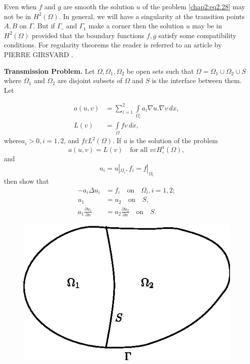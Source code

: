 \begin{REM}\label{chap2:rem3}
Even when $f$ and $g$ are smooth the solution $u$ of the problem
\eqref{chap2:eq2.28} may not be in $H^2(\Omega)$. In general, we will
have a singularity at the transition points $A, B$ on $\Gamma$. But if
$\Gamma_\circ$ and $\Gamma_1$ make a corner then the solution $u$ may
be in $H^2(\Omega)$ provided that the boundary functions $f, g$
satisfy some compatibility conditions. For regularity theorems the
reader is referred to an article by PIERRE GIRSVARD \cite{key22}.
\end{REM}

\setcounter{exer}{0}
\begin{exer}\label{chap2:exr1}
{\bf Transmission Problem.} Let $\Omega, \Omega_1, \Omega_2$ be open
sets such that $\Omega =\Omega_1\cup\Omega_2\cup S$ where $\Omega_1$
and $\Omega_2$ are disjoint subsets of $\Omega$ and $S$ is the
interface between them. Let 
\end{exer}
\begin{align*}
a(u, v) &= \sum\limits_{i=1}^2\int\limits_{\Omega_i}a_i\nabla
u.\nabla v\,dx,\\
L(v) &= \int\limits_\Omega fv\,dx, 
\end{align*}
where\pageoriginale $a_i>0, i=1, 2$, and $f\varepsilon
L^2(\Omega)$. If $u$ is the solution of the problem
$$
a(u, v)=L(v)\quad\text{for all } v\varepsilon H_\circ^1(\Omega),
$$
and
$$
u_i=u|_{\Omega_i}, f_i=f|_{\Omega_i}
$$
then show that 
\begin{align*}
-a_i\Delta u_i &= f_i\quad\text{on}\quad\Omega_i, i=1, 2;\\
u_1 &= u_2\quad\text{on}\quad S,\\
a_1\frac{\partial u_1}{\partial n} &= a_2\frac{\partial u_2} {\partial
  n}\quad\text{on}\quad S.
\end{align*}
\begin{figure}[H]
\centering
\includegraphics{figure/fig2.2.eps}
\caption{}\label{fig2.2}
\end{figure}

